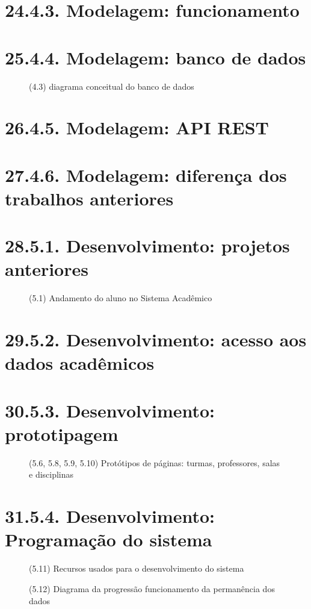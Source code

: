 \chapter*{24.4.3. Modelagem: funcionamento}
\chapter*{25.4.4. Modelagem: banco de dados}
\begin{figure}[htpb]\caption{(4.3) diagrama conceitual do banco de dados}\end{figure}
\chapter*{26.4.5. Modelagem: API REST}
\chapter*{27.4.6. Modelagem: diferença dos trabalhos anteriores}
\cite{Sanya2013}

\cite{Ricardo2014}
\chapter{28.5.1. Desenvolvimento: projetos anteriores}
\begin{figure}[htpb]\caption{(5.1) Andamento do aluno no Sistema Acadêmico}\end{figure}
\chapter*{29.5.2. Desenvolvimento: acesso aos dados acadêmicos}
\chapter*{30.5.3. Desenvolvimento: prototipagem}
\begin{figure}[htpb]\caption{(5.6, 5.8, 5.9, 5.10) Protótipos de páginas: turmas, professores, salas e disciplinas}\end{figure}
\chapter*{31.5.4. Desenvolvimento: Programação do sistema}
\begin{figure}[htpb]\caption{(5.11) Recursos usados para o desenvolvimento do sistema}\end{figure}
\begin{figure}[htpb]\caption{(5.12) Diagrama da progressão funcionamento da permanência dos dados}\end{figure}
